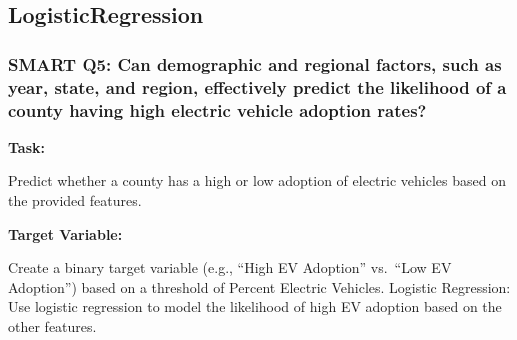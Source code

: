 \documentclass[
  letterpaper,
  DIV=11,
  numbers=noendperiod]{scrartcl}
\begin{document}
\hypertarget{logisticregression}{%
\subsection{LogisticRegression}\label{logisticregression}}

\hypertarget{smart-q5-can-demographic-and-regional-factors-such-as-year-state-and-region-effectively-predict-the-likelihood-of-a-county-having-high-electric-vehicle-adoption-rates}{%
\subsubsection{SMART Q5: Can demographic and regional factors, such as
year, state, and region, effectively predict the likelihood of a county
having high electric vehicle adoption
rates?}\label{smart-q5-can-demographic-and-regional-factors-such-as-year-state-and-region-effectively-predict-the-likelihood-of-a-county-having-high-electric-vehicle-adoption-rates}}

\textbf{Task:}

Predict whether a county has a high or low adoption of electric vehicles
based on the provided features.

\textbf{Target Variable:}

Create a binary target variable (e.g., ``High EV Adoption'' vs.~``Low EV
Adoption'') based on a threshold of Percent Electric Vehicles. Logistic
Regression: Use logistic regression to model the likelihood of high EV
adoption based on the other features.
\end{document}
